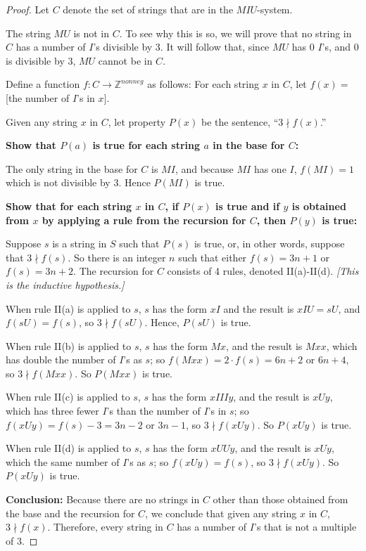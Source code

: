 \documentclass[14pt]{extarticle}
\newcommand{\Z}{\mathbb{Z}}
\begin{document}
\begin{proof}
    Let $C$ denote the set of strings that are in the $M I U$-system.

    The string $MU$ is not in $C$. To see why this is so, we will prove that no string in $C$ has a number of $I$'s
    divisible by 3. It will follow that, since $MU$ has 0 $I$'s, and 0 is divisible by 3, $MU$  cannot be in $C$.

    Define a function \(f: C \to \Z^{nonneg}\) as follows: For each string $x$ in $C$, let \(f(x) = \) [the number of $I$'s in $x$].

    Given any string $x$ in $C$, let property $P(x)$ be the sentence, “\(3 \nmid f(x)\).”

    {\bf Show that $P(a)$ is true for each string $a$ in the base for $C$:}

    The only string in the base for $C$ is $MI$, and because $MI$ has one $I$, $f(MI) = 1$ which is not divisible by 3. Hence $P(MI)$ is true.

        {\bf Show that for each string $x$ in $C$, if $P(x)$ is true and if $y$ is obtained from $x$ by applying a rule
            from the recursion for $C$, then $P(y)$ is true:}

    Suppose $s$ is a string in $S$ such that $P(s)$ is true, or, in other words, suppose that $3 \nmid f(s)$. So there
    is an integer $n$ such that either \(f(s) = 3n+1\) or \(f(s) = 3n+2\). The recursion for $C$ consists of 4 rules,
    denoted II(a)-II(d). {\it [This is the inductive hypothesis.]}

    When rule II(a) is applied to $s$, $s$ has the form $xI$ and the result is $xIU = sU$, and \(f(sU) = f(s)\),
    so \(3 \nmid f(sU)\). Hence, $P(sU)$ is true.

    When rule II(b) is applied to $s$, $s$ has the form $Mx$, and the result is $Mxx$, which has double the number of
    $I$'s as $s$; so \(f(Mxx) = 2 \cdot f(s) = 6n+2\) or $6n+4$, so \(3 \nmid f(Mxx)\). So $P(Mxx)$ is true.

    When rule II(c) is applied to $s$, $s$ has the form $xIIIy$, and the result is $xUy$, which has three fewer
    $I$'s than the number of $I$'s in $s$; so \(f(xUy) = f(s) - 3 = 3n-2\) or $3n - 1$, so \(3 \nmid f(xUy)\).
    So $P(xUy)$ is true.

    When rule II(d) is applied to $s$, $s$ has the form $xUUy$, and the result is $xUy$, which the same number of $I$'s as
    $s$; so \(f(xUy) = f(s)\), so \(3 \nmid f(xUy)\). So $P(xUy)$ is true.

        {\bf Conclusion:} Because there are no strings in $C$ other than those obtained from the base and the recursion for $C$, we conclude that given any string $x$ in $C$, \(3 \nmid f(x)\). Therefore, every string in $C$ has a number of $I$'s that is not a multiple of 3.
\end{proof}
\end{document}

